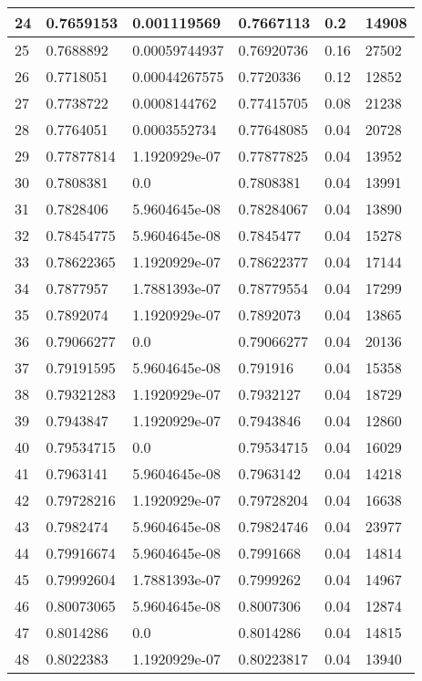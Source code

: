 \begin{longtable}{|l|l|l|l|l|l|}
24 & 0.7659153 & 0.001119569 & 0.7667113 & 0.2 & 14908 \\ \hline 
25 & 0.7688892 & 0.00059744937 & 0.76920736 & 0.16 & 27502 \\ \hline 
26 & 0.7718051 & 0.00044267575 & 0.7720336 & 0.12 & 12852 \\ \hline 
27 & 0.7738722 & 0.0008144762 & 0.77415705 & 0.08 & 21238 \\ \hline 
28 & 0.7764051 & 0.0003552734 & 0.77648085 & 0.04 & 20728 \\ \hline 
29 & 0.77877814 & 1.1920929e-07 & 0.77877825 & 0.04 & 13952 \\ \hline 
30 & 0.7808381 & 0.0 & 0.7808381 & 0.04 & 13991 \\ \hline 
31 & 0.7828406 & 5.9604645e-08 & 0.78284067 & 0.04 & 13890 \\ \hline 
32 & 0.78454775 & 5.9604645e-08 & 0.7845477 & 0.04 & 15278 \\ \hline 
33 & 0.78622365 & 1.1920929e-07 & 0.78622377 & 0.04 & 17144 \\ \hline 
34 & 0.7877957 & 1.7881393e-07 & 0.78779554 & 0.04 & 17299 \\ \hline 
35 & 0.7892074 & 1.1920929e-07 & 0.7892073 & 0.04 & 13865 \\ \hline 
36 & 0.79066277 & 0.0 & 0.79066277 & 0.04 & 20136 \\ \hline 
37 & 0.79191595 & 5.9604645e-08 & 0.791916 & 0.04 & 15358 \\ \hline 
38 & 0.79321283 & 1.1920929e-07 & 0.7932127 & 0.04 & 18729 \\ \hline 
39 & 0.7943847 & 1.1920929e-07 & 0.7943846 & 0.04 & 12860 \\ \hline 
40 & 0.79534715 & 0.0 & 0.79534715 & 0.04 & 16029 \\ \hline 
41 & 0.7963141 & 5.9604645e-08 & 0.7963142 & 0.04 & 14218 \\ \hline 
42 & 0.79728216 & 1.1920929e-07 & 0.79728204 & 0.04 & 16638 \\ \hline 
43 & 0.7982474 & 5.9604645e-08 & 0.79824746 & 0.04 & 23977 \\ \hline 
44 & 0.79916674 & 5.9604645e-08 & 0.7991668 & 0.04 & 14814 \\ \hline 
45 & 0.79992604 & 1.7881393e-07 & 0.7999262 & 0.04 & 14967 \\ \hline 
46 & 0.80073065 & 5.9604645e-08 & 0.8007306 & 0.04 & 12874 \\ \hline 
47 & 0.8014286 & 0.0 & 0.8014286 & 0.04 & 14815 \\ \hline 
48 & 0.8022383 & 1.1920929e-07 & 0.80223817 & 0.04 & 13940 \\ \hline 

\end{longtable}
